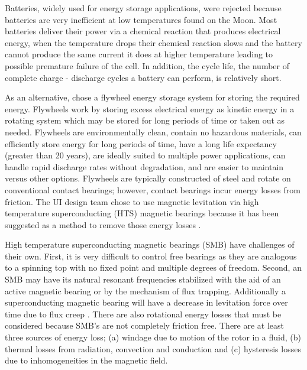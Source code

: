 Batteries, widely used for energy storage applications, were rejected because batteries are very inefficient at low temperatures found on the Moon. Most batteries deliver their power via a chemical reaction that produces electrical energy, when the temperature drops their chemical reaction slows and the battery cannot produce the same current it does at higher temperature leading to possible premature failure of the cell.  In addition, the cycle life, the number of complete charge - discharge cycles a battery can perform, is relatively short. 

As an alternative, chose a flywheel energy storage system for storing the required energy. Flywheels work by storing excess electrical energy as kinetic energy in a rotating system which may be stored for long periods of time or taken out as needed. Flywheels are environmentally clean, contain no hazardous materials, can efficiently store energy for long periods of time, have a long life expectancy (greater than 20 years), are ideally suited to multiple power applications, can handle rapid discharge rates without degradation, and are easier to maintain versus other options. Flywheels are typically constructed of steel and rotate on conventional contact bearings; however, contact bearings incur energy losses from friction.  The UI design team chose to use magnetic levitation via high temperature superconducting (HTS) magnetic bearings because it has been suggested as a method to remove those energy losses \cite{xia, miyazakim, fang, cansiz, strasik, sung, sotelo2, nagashima, birkner, werfel, coombs002, ma, mulcahy1,choi}. 

High temperature superconducting magnetic bearings (SMB) have challenges of their own.  First, it is very difficult to control free bearings as they are analogous to a spinning top with no fixed point and multiple degrees of freedom.  Second, an SMB may have its natural resonant frequencies stabilized with the aid of an active magnetic bearing or by the mechanism of flux trapping.  Additionally a superconducting magnetic bearing will have a decrease in levitation force over time due to flux creep \cite{miyazakim, suzuki, postrekhin}.  There are also rotational energy losses that must be considered because SMB's are not completely friction free.  There are at least three sources of energy loss\cite{xia, sotelo2}; (a) windage due to motion of the rotor in a fluid, (b) thermal losses from radiation, convection and conduction and (c) hysteresis losses due to inhomogeneities in the magnetic field.

